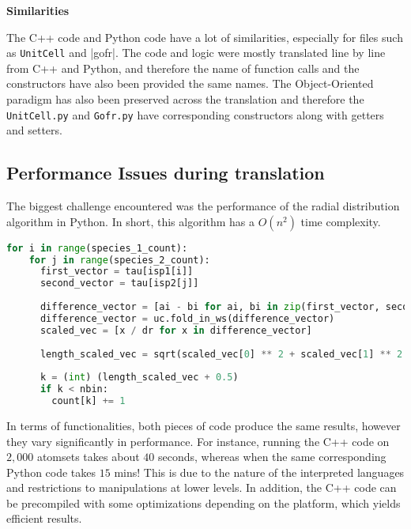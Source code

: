 \textbf{Similarities}

The C++ code and Python code have a lot of similarities, especially for files such as \verb|UnitCell| and |gofr|. The code and logic were mostly translated line by line from C++ and Python, and therefore the name of function calls and the constructors have also been provided the same names. The Object-Oriented paradigm has also been preserved across the translation and therefore the \verb|UnitCell.py| and \verb|Gofr.py| have corresponding constructors along with getters and setters. 

\subsection*{Performance Issues during translation}

The biggest challenge encountered was the performance of the radial distribution algorithm in Python. In short, this algorithm has a $O(n^2)$ time complexity.  

\begin{lstlisting}[language=Python, caption=Python Code which computes the gofr.]
 for i in range(species_1_count):
    for j in range(species_2_count):
      first_vector = tau[isp1[i]]
      second_vector = tau[isp2[j]]
      
      difference_vector = [ai - bi for ai, bi in zip(first_vector, second_vector)]
      difference_vector = uc.fold_in_ws(difference_vector)
      scaled_vec = [x / dr for x in difference_vector]
      
      length_scaled_vec = sqrt(scaled_vec[0] ** 2 + scaled_vec[1] ** 2 + scaled_vec[2] ** 2)
     
      k = (int) (length_scaled_vec + 0.5)
      if k < nbin:
        count[k] += 1
\end{lstlisting}

In terms of functionalities, both pieces of code produce the same results, however they vary significantly in performance. For instance, running the C++ code on $2,000$ atomsets takes about $40$ seconds, whereas when the same corresponding Python code takes $15$ mins! This is due to the nature of the interpreted languages and restrictions to manipulations at lower levels. In addition, the C++ code can be precompiled with some optimizations depending on the platform, which yields efficient results. 






